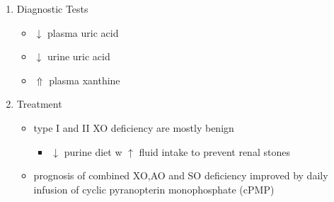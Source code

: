 \documentclass{scrartcl}
\begin{document}
\begin{enumerate}
\item Diagnostic Tests
\label{sec:orgff28477}
\begin{itemize}
\item \(\downarrow\) plasma uric acid
\item \(\downarrow\) urine uric acid
\item \(\Uparrow\) plasma xanthine
\end{itemize}

\item Treatment
\label{sec:org5b78b4e}
\begin{itemize}
\item type I and II XO deficiency are mostly benign
\begin{itemize}
\item \(\downarrow\) purine diet w \(\uparrow\) fluid intake to prevent renal stones
\end{itemize}
\item prognosis of combined XO,AO and SO deficiency improved by daily
infusion of cyclic pyranopterin monophosphate (cPMP)
\end{itemize}
\end{enumerate}
\end{document}
